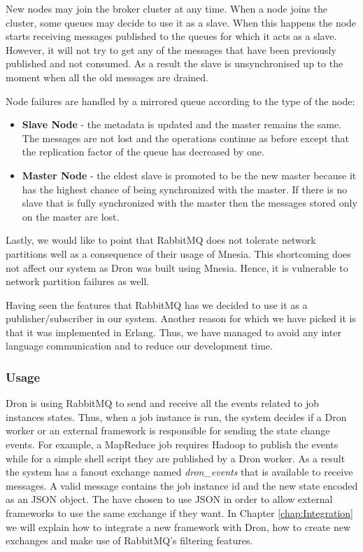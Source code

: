 \documentclass[11pt,a4paper,twoside]{report}
\begin{document}
New nodes may join the broker cluster at any time. When a node joins the cluster, some queues may decide to use it as a slave. When this happens the node starts receiving messages published to the queues for which it acts as a slave. However, it will not try to get any of the messages that have been previously published and not consumed. As a result the slave is unsynchronised up to the moment when all the old messages are drained.


Node failures are handled by a mirrored queue according to the type of the node:
\begin{itemize}
\item{}
\textbf{Slave Node} - the metadata is updated and the master remains the same. The messages are not lost and the operations continue as before except that the replication factor of the queue has decreased by one.
\item{}
\textbf{Master Node} - the eldest slave is promoted to be the new master because it has the highest chance of being synchronized with the master. If there is no slave that is fully synchronized with the master then the messages stored only on the master are lost.
\end{itemize}


Lastly, we would like to point that RabbitMQ does not tolerate network partitions well as a consequence of their usage of Mnesia. This shortcoming does not affect our system as Dron was built using Mnesia. Hence, it is vulnerable to network partition failures as well.


Having seen the features that RabbitMQ has we decided to use it as a publisher/subscriber in our system. Another reason for which we have picked it is that it was implemented in Erlang. Thus, we have managed to avoid any inter language communication and to reduce our development time. 

\subsubsection{Usage}

Dron is using RabbitMQ to send and receive all the events related to job instances states. Thus, when a job instance is run, the system decides if  a Dron worker or an external framework is responsible for sending the state change events. For example, a MapReduce job requires Hadoop to publish the events while for a simple shell script they are published by a Dron worker. As a result the system has a fanout exchange named \textit{dron\_events} that is available to receive messages. A valid message contains the job instance id and the new state encoded as an JSON object. The have chosen to use JSON in order to allow external frameworks to use the same exchange if they want. In Chapter \ref{chap:Integration} we will explain how to integrate a new framework with Dron, how to create new exchanges and make use of RabbitMQ's filtering features.
\end{document}
